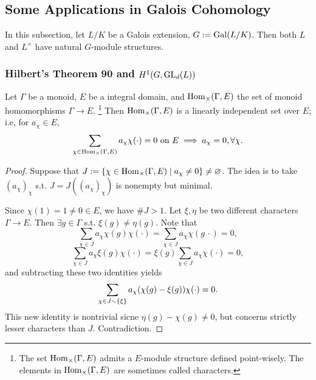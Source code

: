 \subsection{Some Applications in Galois Cohomology}
In this subsection, let $L/K$ be a Galois extension, $G := \operatorname{Gal}(L/K)$. Then both $L$ and $L^\times$ have natural $G$-module structures.

\subsubsection{Hilbert's Theorem 90 and \texorpdfstring{$H^1(G, \operatorname{GL}_d(L))$}{H1(G, L cross)}}

\begin{theorem}\label{dedekind theorem on linearly independence of characters}
    Let $\Gamma$ be a monoid, $E$ be a integral domain, and $\operatorname{Hom}_{\times}(\Gamma, E)$ the set of monoid homomorphisms $\Gamma\to E$.
    \footnote{
        The set $\operatorname{Hom}_{\times}(\Gamma, E)$ admits a $E$-module structure defined point-wisely.
        The elements in $\operatorname{Hom}_{\times}(\Gamma, E)$ are sometimes called characters.
    }
    Then $\operatorname{Hom}_{\times}(\Gamma, E)$ is a linearly independent set over $E$; i.e, for $a_\chi\in E$,
    \[\sum_{\chi\in\operatorname{Hom}_{\times}(\Gamma, E)} a_\chi\chi(\cdot) = 0\text{ on }E
    \implies a_\chi = 0,\forall\chi.\]
\end{theorem}
\begin{proof}
    Suppose that $J := \{\chi\in\operatorname{Hom}_{\times}(\Gamma, E)\mid a_\chi\ne 0\}\ne\varnothing$.
    The idea is to {\color{blue} take $(a_\chi)_\chi$ s.t.
    $J = J((a_\chi)_\chi)$ is nonempty but minimal}.

    Since $\chi(1) = 1\ne 0\in E$, we have $\# J > 1$.
    Let $\xi, \eta$ be two different characters $\Gamma\to E$. Then $\exists g\in\Gamma$ s.t. $\xi(g)\ne \eta(g)$.
    Note that \[\sum_{\chi\in J} a_\chi \chi(g)\chi(\cdot) = \sum_{\chi\in J} a_\chi\chi(g\,\cdot) = 0,\]
    \[\sum_{\chi\in J}a_\chi\xi(g)\chi(\cdot) = \xi(g)\sum_{\chi\in J}a_\chi\chi(\cdot) = 0,\]
    and subtracting these two identities yields
    \[\sum_{\chi\in J\smallsetminus\{\xi\}} a_\chi(\chi(g) - \xi(g))\chi(\cdot) = 0.\]
    This new identity is nontrivial sicne $\eta(g) - \chi(g)\ne 0$, but concerns strictly lesser characters than $J$. Contradiction.
\end{proof}

